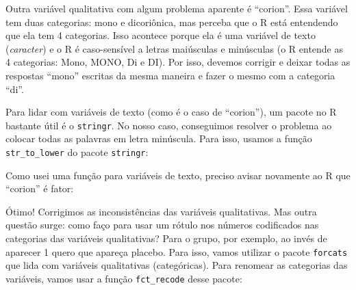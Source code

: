 \documentclass[
]{book}
\newenvironment{Shaded}{\begin{snugshade}}{\end{snugshade}}
\newcommand{\KeywordTok}[1]{\textcolor[rgb]{0.13,0.29,0.53}{\textbf{#1}}}
\newcommand{\NormalTok}[1]{#1}
\newcommand{\OperatorTok}[1]{\textcolor[rgb]{0.81,0.36,0.00}{\textbf{#1}}}
\newcommand{\StringTok}[1]{\textcolor[rgb]{0.31,0.60,0.02}{#1}}
\begin{document}
Outra variável qualitativa com algum problema aparente é ``corion''. Essa variável tem duas categorias: mono e dicoriônica, mas perceba que o R está entendendo que ela tem 4 categorias. Isso acontece porque ela é uma variável de texto (\emph{caracter}) e o R é caso-sensível a letras maiúsculas e minúsculas (o R entende as 4 categorias: Mono, MONO, Di e DI). Por isso, devemos corrigir e deixar todas as respostas ``mono'' escritas da mesma maneira e fazer o mesmo com a categoria ``di''.

Para lidar com variáveis de texto (como é o caso de ``corion''), um pacote no R bastante útil é o \texttt{stringr}. No nosso caso, conseguimos resolver o problema ao colocar todas as palavras em letra minúscula. Para isso, usamos a função \texttt{str\_to\_lower} do pacote \texttt{stringr}:

\begin{Shaded}
\end{Shaded}

Como usei uma função para variáveis de texto, preciso avisar novamente ao R que ``corion'' é fator:

\begin{Shaded}
\end{Shaded}

Ótimo! Corrigimos as inconsistências das variáveis qualitativas. Mas outra questão surge: como faço para usar um rótulo nos números codificados nas categorias das variáveis qualitativas? Para o grupo, por exemplo, ao invés de aparecer 1 quero que apareça placebo.
Para isso, vamos utilizar o pacote \texttt{forcats} que lida com variáveis qualitativas (categóricas). Para renomear as categorias das variáveis, vamos usar a função \texttt{fct\_recode} desse pacote:
\end{document}
